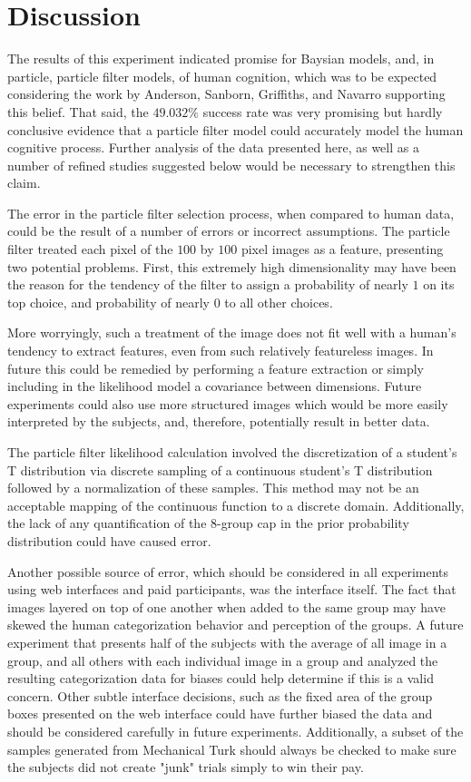 \section{Discussion}
\label{sec:discussion}

The results of this experiment indicated promise for Baysian models, and, in particle, particle
filter models, of human cognition, which was to be expected considering the work
by Anderson, Sanborn, Griffiths, and Navarro supporting this belief. That said,
the $49.032\%$ success rate was very promising but hardly conclusive evidence
that a particle filter model could accurately model the human cognitive process.
Further analysis of the data presented here, as well as a number of refined
studies suggested below would be necessary to strengthen this claim.

The error in the particle filter selection process, when compared to human data,
could be the result of a number of errors or incorrect assumptions. The particle
filter treated each pixel of the $100$ by $100$ pixel images as a feature, presenting
two potential problems. First, this extremely high dimensionality may have been
the reason for the tendency of the filter to assign a probability of nearly $1$
on its top choice, and probability of nearly $0$ to all other choices.

More worryingly, such a treatment of the image does not fit well with a human's
tendency to extract features, even from such relatively featureless images. In
future this could be remedied by performing a feature extraction or simply
including in the likelihood model a covariance between dimensions. Future
experiments could also use more structured images which would be more easily
interpreted by the subjects, and, therefore, potentially result in better data.

The particle filter likelihood calculation involved the discretization of a
student's T distribution via discrete sampling of a continuous student's T
distribution followed by a normalization of these samples. This method may not
be an acceptable mapping of the continuous function to a discrete domain.
Additionally, the lack of any quantification of the 8-group cap in the prior
probability distribution could have caused error.

Another possible source of error, which should be considered in all experiments
using web interfaces and paid participants, was the interface itself. The fact
that images layered on top of one another when added to the same group may have
skewed the human categorization behavior and perception of the groups. A future
experiment that presents half of the subjects with the average of all image in a group,
and all others with each individual image in a group and analyzed the resulting
categorization data for biases could help determine if this is a valid concern.
Other subtle interface decisions, such as the fixed area of the group boxes presented
on the web interface could have further biased the data and should be considered
carefully in future experiments. Additionally, a subset of the samples generated
from Mechanical Turk should always be checked to make sure the subjects did not
create "junk" trials simply to win their pay.

